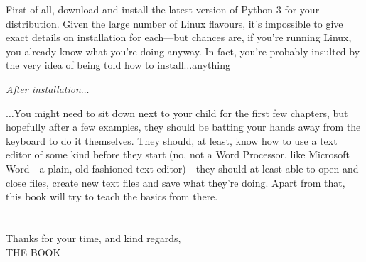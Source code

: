 \begin{LINUX}

\noindent
First of all, download and install the latest version of Python 3 for your distribution.  Given the large number of Linux flavours, it's impossible to give exact details on installation for each---but chances are, if you're running Linux, you already know what you're doing anyway.  In fact, you're probably insulted by the very idea of being told how to install$\ldots$anything

\end{LINUX}

\noindent
\emph{\color{BrickRed}After installation$\ldots$}

\noindent
$\ldots$You might need to sit down next to your child for the first few chapters, but hopefully after a few examples, they should be batting your hands away from the keyboard to do it themselves.  They should, at least, know how to use a text editor of some kind before they start (no, not a Word Processor, like Microsoft Word---a plain, old-fashioned text editor)---they should at least able to open and close files, create new text files and save what they're doing.  Apart from that, this book will try to teach the basics from there.
\\
\\
\noindent\\
Thanks for your time, and kind regards,
\noindent\\
THE BOOK
